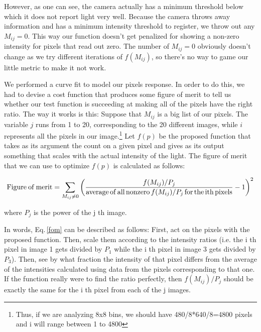 However, as one can see, the camera actually has a minimum threshold below which it does not report light very well. Because the camera throws away information and has a minimum intensity threshold to register, we throw out any $M_{i j}=0$. This way our function doesn't get penalized for showing a non-zero intensity for pixels that read out zero. The number of $M_{i j}=0$ obviously doesn't change as we try different iterations of $f(M_{ij})$, so there's no way to game our little metric to make it not work.

We performed a curve fit to model our pixels response. In order to do this, we had to devise a cost function that produces some figure of merit to tell us whether our test function is succeeding at making all of the pixels have the right ratio. The way it works is this: Suppose that $M_{i j}$ is a big list of our pixels. The variable $j$ runs from 1 to 20, corresponding to the 20 different images, while $i$ represents all the pixels in our image.\footnote{Thus, if we are analyzing 8x8 bins, we should have 480/8*640/8=4800 pixels and i will range between 1 to 4800} Let $f(p)$ be the proposed function that takes as its argument the count on a given pixel and gives as its output something that scales with the actual intensity of the light. The figure of merit that we can use to optimize $f(p)$ is calculated as follows: 

\begin{equation}\label{fom}
{\rm Figure\:of\:merit}=\sum_{ M_{i j}\neq 0}\left(\frac{f(M_{i j})/P_j}{{\rm average\,of\,all\,nonzero\,} f(M_{i j})/P_j {\rm \,for\,the\,ith\,pixels}}-1\right)^2
\end{equation}

where $P_j$ is the power of the j th image.

In words, Eq.\,\ref{fom} can be described as follows: First, act on the pixels with the proposed function. Then, scale them according to the intensity ratios (i.e. the i th pixel in image 1 gets divided by $P_1$ while the i th pixel in image 3 gets divided by $P_3$). Then, see by what fraction the intensity of that pixel differs from the average of the intensities calculated using data from the pixels corresponding to that one. If the function really were to find the ratio perfectly, then $f(M_{ij})/P_j$ should be exactly the same for the i th pixel from each of the j images. 


